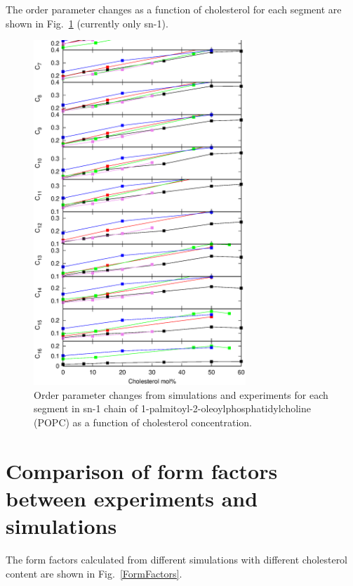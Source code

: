 \documentclass[aps,prl,superscriptaddress,twocolumn]{revtex4}
\begin{document}
The order parameter changes as a function of cholesterol for each segment are shown in Fig.~\ref{OrderParametersCHOLchanges}
(currently only sn-1).

 \begin{figure}[]
  \centering
  \includegraphics[width=8cm]{../FIGS/OrderParametersCHANGEScholSN1.eps}

  \caption{\label{OrderParametersCHOLchanges}
    Order parameter changes from simulations and experiments for each segment in sn-1 chain of  1-palmitoyl-2-oleoylphosphatidylcholine (POPC) as a function of cholesterol concentration.}

\end{figure}

\newpage
\section{Comparison of form factors between experiments and simulations}
The form factors calculated from different simulations with different cholesterol content are shown in 
Fig.~\ref{FormFactors}.
\end{document}
